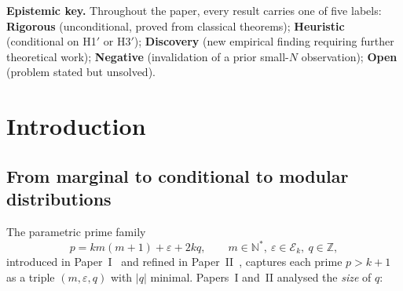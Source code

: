 \documentclass[11pt,a4paper]{article}
\theoremstyle{plain}
\theoremstyle{definition}
\newcommand{\Z}{\mathbb{Z}}
\newcommand{\N}{\mathbb{N}}
\newcommand{\eps}{\varepsilon}
\newcommand{\Eclass}{\mathcal{E}}
\begin{document}
\begin{abstract}
\smallskip
\textbf{Connection to Paper~II}: Hypothesis H3$'$ is a structural analogue of
Paper~II's H3 for the residue class. Theorem~\ref{thm:main} thereby provides
an \textbf{indirect quantitative test} of H3 via measurable distributions.
The empirical agreement is consistent with H3 holding in the regime tested,
but this constitutes \emph{empirical support}, not proof: the unconditional
barrier (parity problem; uniform PNT in arithmetic progressions of large
moduli) is unchanged.

\smallskip
\textbf{Status of results}: Theorem~\ref{thm:degenerate} is unconditional.
Theorem~\ref{thm:main}, Proposition~\ref{prop:h3-implies-h3prime}, and the
ACF conjectures are heuristic or conditional, with carefully tracked
hypotheses. We discuss the obstacles to unconditional proof in
Section~\ref{sec:connection}.

\smallskip
\textbf{MSC 2020}: 11N32, 11N13, 11Y11, 11M41, 62P99.\\
\textbf{Keywords}: prime numbers, parametric families, $p$-adic distribution,
Bateman--Horn conjecture, autocorrelation, anti-persistence.
\end{abstract}

\begin{heuristicbox}
\noindent\textbf{Epistemic key.} Throughout the paper, every result carries one of
five labels: \textbf{Rigorous} (unconditional, proved from classical theorems);
\textbf{Heuristic} (conditional on H1$'$ or H3$'$); \textbf{Discovery} (new
empirical finding requiring further theoretical work); \textbf{Negative}
(invalidation of a prior small-$N$ observation); \textbf{Open} (problem stated
but unsolved).
\end{heuristicbox}

\tableofcontents

\section{Introduction}
\label{sec:intro}

\subsection{From marginal to conditional to modular distributions}

The parametric prime family
\begin{equation}
p = km(m+1) + \eps + 2kq, \qquad m \in \N^*,\ \eps \in \Eclass_k,\ q \in \Z,
\label{eq:family}
\end{equation}
introduced in Paper~I~\cite{paper1} and refined in Paper~II~\cite{paper2}, captures
each prime $p > k+1$ as a triple $(m, \eps, q)$ with $|q|$ minimal. Papers~I and~II
analysed the \emph{size} of $q$:
\end{document}
